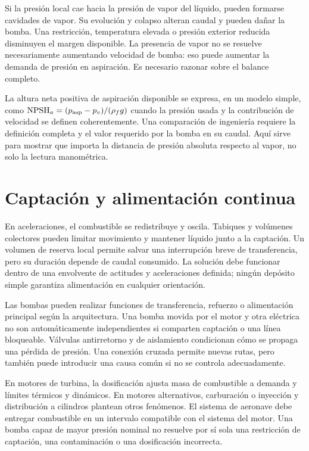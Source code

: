 Si la presión local cae hacia la presión de vapor del líquido, pueden formarse cavidades de vapor. Su evolución y colapso alteran caudal y pueden dañar la bomba. Una restricción, temperatura elevada o presión exterior reducida disminuyen el margen disponible. La presencia de vapor no se resuelve necesariamente aumentando velocidad de bomba: eso puede aumentar la demanda de presión en aspiración. Es necesario razonar sobre el balance completo.

La altura neta positiva de aspiración disponible se expresa, en un modelo simple, como $\mathrm{NPSH}_a=(p_{\rm asp}-p_v)/(\rho_f g)$ cuando la presión usada y la contribución de velocidad se definen coherentemente. Una comparación de ingeniería requiere la definición completa y el valor requerido por la bomba en su caudal. Aquí sirve para mostrar que importa la distancia de presión absoluta respecto al vapor, no solo la lectura manométrica.

\section{Captación y alimentación continua}
En aceleraciones, el combustible se redistribuye y oscila. Tabiques y volúmenes colectores pueden limitar movimiento y mantener líquido junto a la captación. Un volumen de reserva local permite salvar una interrupción breve de transferencia, pero su duración depende de caudal consumido. La solución debe funcionar dentro de una envolvente de actitudes y aceleraciones definida; ningún depósito simple garantiza alimentación en cualquier orientación.

Las bombas pueden realizar funciones de transferencia, refuerzo o alimentación principal según la arquitectura. Una bomba movida por el motor y otra eléctrica no son automáticamente independientes si comparten captación o una línea bloqueable. Válvulas antirretorno y de aislamiento condicionan cómo se propaga una pérdida de presión. Una conexión cruzada permite nuevas rutas, pero también puede introducir una causa común si no se controla adecuadamente.

En motores de turbina, la dosificación ajusta masa de combustible a demanda y límites térmicos y dinámicos. En motores alternativos, carburación o inyección y distribución a cilindros plantean otros fenómenos. El sistema de aeronave debe entregar combustible en un intervalo compatible con el sistema del motor. Una bomba capaz de mayor presión nominal no resuelve por sí sola una restricción de captación, una contaminación o una dosificación incorrecta.

